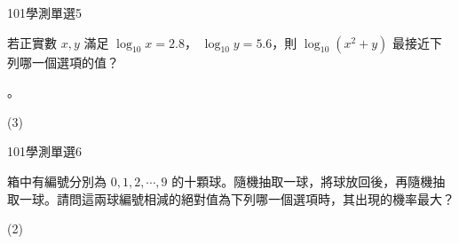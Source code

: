     \begin{QUESTION}
        \begin{ExamInfo}{101}{學測}{單選}{5}
        \end{ExamInfo}
        \begin{ExamAnsRateInfo}{51}{91}{46}{16}
        \end{ExamAnsRateInfo}
        \begin{QBODY}
            若正實數 $x, y$ 滿足 $\log_{10} x =2.8  $， $\log_{10} y = 5.6$，則 $\log_{10} ( x^2 + y)$ 最接近下列哪一個選項的值？
			\begin{QOPS} 
				 。
			\end{QOPS}
        \end{QBODY}
        \begin{QFROMS}
        \end{QFROMS}
        \begin{QTAGS}\end{QTAGS}
        \begin{QANS}
            (3)
        \end{QANS}
        \begin{QSOLLIST}
        \end{QSOLLIST}
        \begin{QEMPTYSPACE}
        \end{QEMPTYSPACE}
    \end{QUESTION}
    \begin{QUESTION}
        \begin{ExamInfo}{101}{學測}{單選}{6}
        \end{ExamInfo}
        \begin{ExamAnsRateInfo}{66}{84}{71}{43}
        \end{ExamAnsRateInfo}
        \begin{QBODY}
            箱中有編號分別為 $0,1, 2, \cdots ,9$   的十顆球。隨機抽取一球，將球放回後，再隨機抽取一球。請問這兩球編號相減的絕對值為下列哪一個選項時，其出現的機率最大？
			\begin{QOPS}
				\QOP  0  
				\QOP  1 
				\QOP  4 
				\QOP  5 
				\QOP  9
			\end{QOPS}
        \end{QBODY}
        \begin{QFROMS}
        \end{QFROMS}
        \begin{QTAGS}\end{QTAGS}
        \begin{QANS}
            (2)
        \end{QANS}
        \begin{QSOLLIST}
        \end{QSOLLIST}
        \begin{QEMPTYSPACE}
        \end{QEMPTYSPACE}
    \end{QUESTION}
